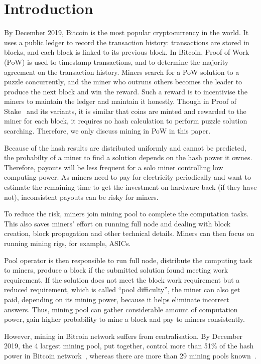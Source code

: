 \section{Introduction}

By December 2019, Bitcoin is the most popular cryptocurrency in the world.
It uses a public ledger to record the transaction history: transactions are stored in blocks, and each block is linked to its previous block.
In Bitcoin, Proof of Work (PoW) is used to timestamp transactions, and to determine the majority agreement on the transaction history.
Miners search for a PoW solution to a puzzle concurrently, and the miner who outruns others becomes the leader to produce the next block and win the reward.
Such a reward is to incentivise the miners to maintain the ledger and maintain it honestly.
Though in Proof of Stake~\cite{} and its variants, it is similar that coins are minted and rewarded to the miner for each block, it requires no hash calculation to perform puzzle solution searching.
Therefore, we only discuss mining in PoW in this paper.

Because of the hash results are distributed uniformly and cannot be predicted, the probabilty of a miner to find a solution depends on the hash power it ownes.
Therefore, payouts will be less frequent for a solo miner controlling low computing power.
As miners need to pay for electricity periodically and want to estimate the remaining time to get the investment on hardware back (if they have not), inconsistent payouts can be risky for miners.

To reduce the risk, miners join mining pool to complete the computation tasks.
This also saves miners' effort on running full node and dealing with block creation, block propogation and other technical details.
Miners can then focus on running mining rigs, for example, ASICs.

Pool operator is then responsible to run full node, distribute the computing task to miners, 
produce a block if the submitted solution found meeting work requirement.
If the solution does not meet the block work requirement but a reduced requirement, which is called ``pool difficulty'', the miner can also get paid, depending on its mining power, because it helps eliminate incorrect answers.
Thus, mining pool can gather considerable amount of computation power, gain higher probability to mine a block and pay to miners consistently.

However, mining in Bitcoin network suffers from centralisation.
By December 2019, the 4 largest mining pool, put together, control more than 51\% of the hash power in Bitcoin network~\cite{}, whereas there are more than 29 mining pools known~\cite{}.

